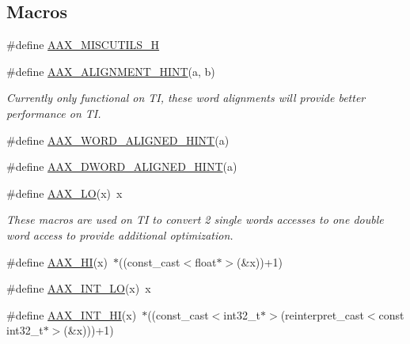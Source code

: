 \subsection*{Macros}
\begin{DoxyCompactItemize}
\item 
\#define \hyperlink{a00271_a89034ace563ff82face40a019fc93063}{A\+A\+X\+\_\+\+M\+I\+S\+C\+U\+T\+I\+L\+S\+\_\+\+H}
\item 
\#define \hyperlink{a00271_a7eb399409be7572c8bd589395c450cdc}{A\+A\+X\+\_\+\+A\+L\+I\+G\+N\+M\+E\+N\+T\+\_\+\+H\+I\+N\+T}(a,  b)
\begin{DoxyCompactList}\small\item\em Currently only functional on T\+I, these word alignments will provide better performance on T\+I. \end{DoxyCompactList}\item 
\#define \hyperlink{a00271_a61b7ad0861da92bf265b94334b9b042f}{A\+A\+X\+\_\+\+W\+O\+R\+D\+\_\+\+A\+L\+I\+G\+N\+E\+D\+\_\+\+H\+I\+N\+T}(a)
\item 
\#define \hyperlink{a00271_a31858c8aae0329f66ac1bfbc2fadd013}{A\+A\+X\+\_\+\+D\+W\+O\+R\+D\+\_\+\+A\+L\+I\+G\+N\+E\+D\+\_\+\+H\+I\+N\+T}(a)
\item 
\#define \hyperlink{a00271_a30b9af679d91539e6aa0871d36c4b024}{A\+A\+X\+\_\+\+L\+O}(x)~x
\begin{DoxyCompactList}\small\item\em These macros are used on T\+I to convert 2 single words accesses to one double word access to provide additional optimization. \end{DoxyCompactList}\item 
\#define \hyperlink{a00271_a51ea059e820f6ca326531adb132183c3}{A\+A\+X\+\_\+\+H\+I}(x)~$\ast$((const\+\_\+cast$<$float$\ast$$>$(\&x))+1)
\item 
\#define \hyperlink{a00271_a28c81661236c242d6ed7a3050033bba7}{A\+A\+X\+\_\+\+I\+N\+T\+\_\+\+L\+O}(x)~x
\item 
\#define \hyperlink{a00271_a6160eaa64818bfff43404b5c057f5f5f}{A\+A\+X\+\_\+\+I\+N\+T\+\_\+\+H\+I}(x)~$\ast$((const\+\_\+cast$<$int32\+\_\+t$\ast$$>$(reinterpret\+\_\+cast$<$const int32\+\_\+t$\ast$$>$(\&x)))+1)
\end{DoxyCompactItemize}
